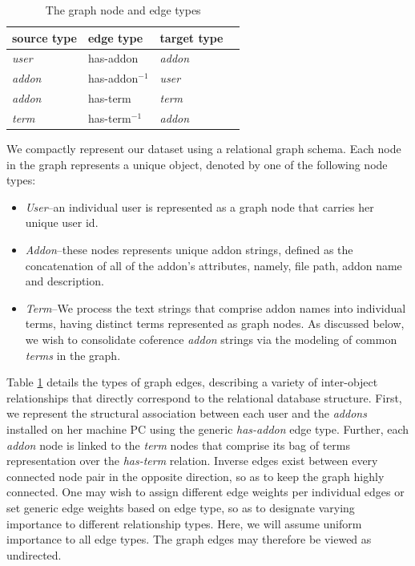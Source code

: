 \documentclass[ijoc,nonblindrev]{informs3} %
\numberwithin{equation}{subsection}
\begin{document}
\begin{table}[t]
\begin{center}
\begin{small}
\begin{tabular}{llll}
\hline 
\textbf{source type} & \textbf{edge type} & \textbf{target type} \\
\hline
{\it user} & has-addon & {\it addon} \\
\hline
{\it addon} &  has-addon$^{-1}$ & {\it user} \\
{\it addon} & has-term & {\it term} \\
\hline
{\it term} & has-term$^{-1}$ & {\it addon} \\
\hline
\end{tabular}
\end{small}
\end{center}
\caption{\label{tab:graph_structure} The graph node and edge types}
\end{table}

We compactly represent our dataset using a relational graph schema. Each node in the graph represents a unique object, denoted by one of the following node types:
\begin{itemize}
\renewcommand{\labelitemi}{$\bullet$} 
\item {\it User}--an individual user is represented as a graph node that carries her unique user id. 
\item {\it Addon}--these nodes represents unique addon strings, defined as the concatenation of all of the addon's attributes, namely, file path, addon name and description.
\item {\it Term}--We process the text strings that comprise addon names into individual terms, having distinct terms represented as graph nodes. As discussed below, we wish to consolidate coference {\it addon} strings via the modeling of common {\it terms} in the graph.
\end{itemize}

Table \ref{tab:graph_structure} details the types of graph edges, describing a variety of inter-object relationships that directly correspond to the relational database structure.  First, we represent the structural association between each user and the {\it addons} installed on her machine PC using the generic {\it has-addon} edge type. Further, each {\it addon} node is linked to the {\it term} nodes that comprise its bag of terms representation over the {\it has-term} relation. Inverse edges exist between every connected node pair in the opposite direction, so as to keep the graph highly connected. One may wish to assign different edge weights per individual edges or set generic edge weights based on edge type, so as to designate varying importance to different relationship types. Here, we will assume uniform importance to all edge types. The graph edges may therefore be viewed as undirected. 
\end{document}
